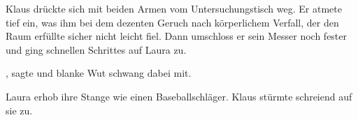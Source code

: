 \par

Klaus drückte sich mit beiden Armen vom Untersuchungstisch weg. Er atmete tief ein, was ihm bei dem dezenten Geruch nach körperlichem Verfall, der den Raum erfüllte sicher nicht leicht fiel. Dann umschloss er sein Messer noch fester und ging schnellen Schrittes auf Laura zu.

\par

, sagte und blanke Wut schwang dabei mit. 

\par

Laura erhob ihre Stange wie einen Baseballschläger.  Klaus stürmte schreiend auf sie zu. 